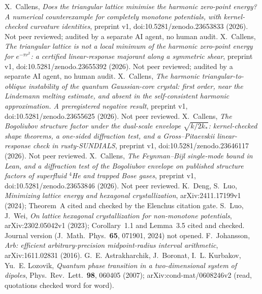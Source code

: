 X.~Callens, \emph{Does the triangular lattice minimise the harmonic zero-point energy? A numerical
counterexample for completely monotone potentials, with kernel-checked curvature identities}, preprint v1,
doi:10.5281/zenodo.23653833 (2026). Not peer reviewed; audited by a separate AI agent, no human audit.
 X.~Callens, \emph{The triangular lattice is not a local minimum of the harmonic zero-point energy for
$e^{-\pi r^2}$: a certified linear-response majorant along a symmetric shear}, preprint v1,
doi:10.5281/zenodo.23655392 (2026). Not peer reviewed; audited by a separate AI agent, no human audit.
 X.~Callens, \emph{The harmonic triangular-to-oblique instability of the quantum Gaussian-core crystal:
first order, near the Lindemann melting estimate, and absent in the self-consistent harmonic approximation. A
preregistered negative result}, preprint v1, doi:10.5281/zenodo.23655625 (2026). Not peer reviewed.
 X.~Callens, \emph{The Bogoliubov structure factor under the dual-scale envelope $\sqrt{k/2k_*}$:
kernel-checked shape theorems, a one-sided diffraction test, and a Gross--Pitaevskii linear-response check in
rusty-SUNDIALS}, preprint v1, doi:10.5281/zenodo.23646117 (2026). Not peer reviewed.
 X.~Callens, \emph{The Feynman--Bijl single-mode bound in Lean, and a diffraction test of the Bogoliubov
envelope on published structure factors of superfluid $^4$He and trapped Bose gases}, preprint v1,
doi:10.5281/zenodo.23653846 (2026). Not peer reviewed.
 K.~Deng, S.~Luo, \emph{Minimizing lattice energy and hexagonal crystallization},
arXiv:2411.17199v1 (2024); Theorem~A cited and checked by the Elenchus citation gate.
 S.~Luo, J.~Wei, \emph{On lattice hexagonal crystallization for non-monotone potentials},
arXiv:2302.05042v1 (2023); Corollary~1.1 and Lemma~3.5 cited and checked. Journal version (J.\ Math.\ Phys.\
\textbf{65}, 071901, 2024) not opened.
 F.~Johansson, \emph{Arb: efficient arbitrary-precision midpoint-radius interval arithmetic},
arXiv:1611.02831 (2016).
 G.~E. Astrakharchik, J.~Boronat, I.~L. Kurbakov, Yu.~E. Lozovik, \emph{Quantum phase transition in a
two-dimensional system of dipoles}, Phys.\ Rev.\ Lett.\ \textbf{98}, 060405 (2007); arXiv:cond-mat/0608246v2 (read,
quotations checked word for word).
